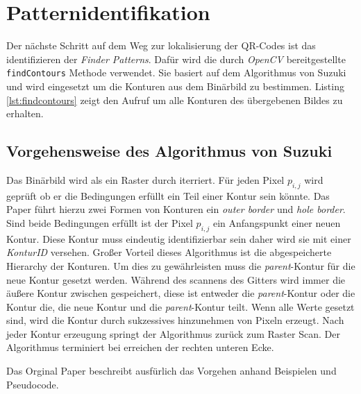 \chapter{Patternidentifikation}
Der nächste Schritt auf dem Weg zur lokalisierung der QR-Codes ist das identifizieren der \emph{Finder Patterns}. Dafür wird die durch \emph{OpenCV} bereitgestellte \texttt{findContours} Methode verwendet. Sie basiert auf dem Algorithmus von Suzuki und wird eingesetzt um die Konturen aus dem Binärbild zu bestimmen.
Listing \ref{lst:findcontours} zeigt den Aufruf um alle Konturen des übergebenen Bildes zu erhalten.

\section{Vorgehensweise des Algorithmus von Suzuki}
Das Binärbild wird als ein Raster durch iterriert. Für jeden Pixel $p_{i,j}$ wird geprüft ob er die Bedingungen erfüllt ein Teil einer Kontur sein könnte. Das Paper     führt hierzu zwei Formen von Konturen ein \emph{outer border} und \emph{hole border}. Sind beide Bedingungen erfüllt ist der Pixel $p_{i,j}$ ein Anfangspunkt einer neuen Kontur. Diese Kontur muss eindeutig identifizierbar sein daher wird sie mit einer \emph{KonturID} versehen. Großer Vorteil dieses Algorithmus ist die abgespeicherte Hierarchy der Konturen. Um dies zu gewährleisten muss die \emph{parent}-Kontur für die neue Kontur gesetzt werden. Während des scannens des Gitters wird immer die äußere Kontur zwischen gespeichert, diese ist entweder die \emph{parent}-Kontur oder die Kontur die, die neue Kontur und die \emph{parent}-Kontur teilt. Wenn alle Werte gesetzt sind, wird die Kontur durch sukzessives hinzunehmen von Pixeln erzeugt. Nach jeder Kontur erzeugung springt der Algorithmus zurück zum Raster Scan. Der Algorithmus terminiert bei erreichen der rechten unteren Ecke.

Das Orginal Paper beschreibt ausfürlich das Vorgehen anhand Beispielen und Pseudocode.

